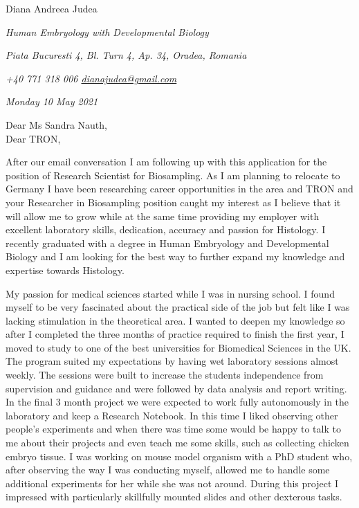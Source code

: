 \documentclass[paper=a4,fontsize=11pt]{scrartcl} %
\newcommand{\sepspace}{\vspace*{1em}}		%
\newcommand{\MyName}[1]{ %
  \Huge \usefont{OT1}{phv}{b}{n} \hfill \textcolor{titleColor}{#1}
  \par \normalsize \normalfont}
\newcommand{\MyCoverSlogan}[4]{ %
  \large \usefont{OT1}{phv}{m}{n}\hfill \textcolor{headerColor}{\textit{#1} }
  \sepspace
  \par \normalsize \usefont{OT1}{phv}{m}{n}\hfill \textcolor{headerColor}{\textit{#2}}
  \par \normalsize \usefont{OT1}{phv}{m}{n}\hfill \textcolor{headerColor}{\textit{#3}}
  \par \normalsize \usefont{OT1}{phv}{m}{n}\hfill \textcolor{headerColor}{\textit{#4}}
  \par \normalsize \normalfont}
\begin{document}
  
  \MyName{Diana Andreea Judea}
  \MyCoverSlogan{Human Embryology with Developmental Biology}{Piata Bucuresti 4, Bl.  Turn 4, Ap.  34, Oradea, Romania}{+40 771 318 006 \hspace{5pt} \href{mailto:dianajudea@gmail.com}{dianajudea@gmail.com}}{Monday 10 May 2021}
  \sepspace %
  
  \noindent
  Dear Ms Sandra Nauth, \\
  Dear TRON,

  \sepspace 

  \noindent After our email conversation I am following up with this
  application for the position of Research Scientist for Biosampling.  As I am planning
  to relocate to Germany I have been researching career opportunities in the area and
  TRON and your Researcher in Biosampling position caught my interest as I
  believe that it will allow me to grow while at the same time providing my
  employer with excellent laboratory skills, dedication, accuracy and passion
  for Histology.  I recently graduated with a degree in Human Embryology and
  Developmental Biology and I am looking for the best way to further expand my
  knowledge and expertise towards Histology.

  \sepspace 

  \noindent My passion for medical sciences started while I was in nursing
  school.  I found myself to be very fascinated about the practical side of the
  job but felt like I was lacking stimulation in the theoretical area.  I
  wanted to deepen my knowledge so after I completed the three months of practice
  required to finish the first year, I moved to study to one of the best
  universities for Biomedical Sciences in the UK.  The program suited my
  expectations by having wet laboratory sessions almost weekly.  The sessions
  were built to increase the students independence from supervision and
  guidance and were followed by data analysis and report writing.  In the final
  3 month project we were expected to work fully autonomously in the laboratory
  and keep a Research Notebook.  In this time I liked observing other
  people’s experiments and when there was time some would be happy to talk to
  me about their projects and even teach me some skills, such as
  collecting chicken embryo tissue.  I was working on mouse model organism
  with a PhD student who, after observing the way I was conducting myself,
  allowed me to handle some additional experiments for her while she was not
  around.  During this project I impressed with particularly skillfully
  mounted slides and other dexterous tasks.
\end{document}

